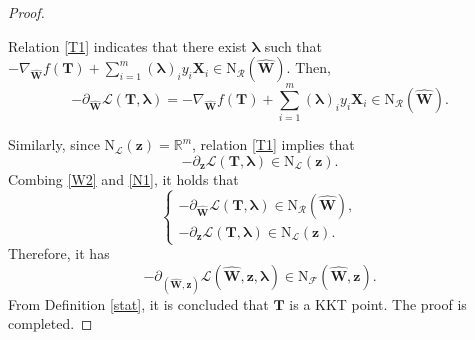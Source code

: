 \documentclass[10pt,a4paper]{amsart}
\begin{document}
\begin{proof}
\begin{description}
	Relation \eqref{T1} indicates that there  exist $\bm{\lambda}$ such that $-\nabla_{\hat{\mathbf{W}}} f(\mathbf{T})+\sum_{i=1}^m(\bm{\lambda})_i y_i\mathbf{X}_i\in\mathrm{N}_{\mathcal{R}}(\hat{\mathbf{W}})$. Then,
	\begin{equation}\label{W2}
    -\partial_{\hat{\mathbf{W}}} \mathscr{L}(\mathbf{T},\bm{\lambda})= -\nabla_{\hat{\mathbf{W}}}f(\mathbf{T})+\sum_{i=1}^m(\bm{\lambda})_i y_i\mathbf{X}_i\in\mathrm{N}_{\mathcal{R}}(\hat{\mathbf{W}}).
    \end{equation}
\end{description}
Similarly, since $\mathrm{N}_{\mathcal{L}}(\mathbf{z})=\mathbb{R}^m$, relation \eqref{T1} implies that 
    	\begin{equation}\label{N1}
        -\partial_\mathbf{z} \mathscr{L}(\mathbf{T},\bm{\lambda})\in\mathrm{N}_{\mathcal{L}}(\mathbf{z}).
            \end{equation}
Combing \eqref{W2} and \eqref{N1}, it holds that
	\begin{equation*}
		\begin{cases}
			-\partial_{\hat{\mathbf{W}}} \mathscr{L}(\mathbf{T},\bm{\lambda})\in\mathrm{N}_{\mathcal{R}}(\hat{\mathbf{W}}),\\
			-\partial_\mathbf{z} \mathscr{L}(\mathbf{T},\bm{\lambda})\in\mathrm{N}_{\mathcal{L}}(\mathbf{z}).
		\end{cases} 
	\end{equation*} 	
Therefore, it has 
	\begin{equation*}
-\partial_{({\hat{\mathbf{W}},\mathbf{z}})}\mathscr{L}(\hat{\mathbf{W}},\mathbf{z},\bm{\lambda})
	\in\text{N}_{\mathcal{F}}(\hat{\mathbf{W}},\mathbf{z}).
	\end{equation*} 
From Definition \ref{stat},  it is concluded that $\mathbf{T}$ is a KKT point. The proof is completed.
\end{proof}
\end{document}
